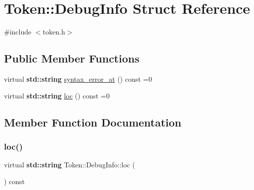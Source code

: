 \hypertarget{struct_token_1_1_debug_info}{}\section{Token\+:\+:Debug\+Info Struct Reference}
\label{struct_token_1_1_debug_info}


{\ttfamily \#include $<$token.\+h$>$}

\subsection*{Public Member Functions}
\begin{DoxyCompactItemize}
\item 
virtual \textbf{ std\+::string} \hyperlink{struct_token_1_1_debug_info_a4d66aa65422c236198bbcc616bba250f}{syntax\+\_\+error\+\_\+at} () const =0
\item 
virtual \textbf{ std\+::string} \hyperlink{struct_token_1_1_debug_info_a0860d9b875240dafa0e00756d27e55bb}{loc} () const =0
\end{DoxyCompactItemize}


\subsection{Member Function Documentation}
\mbox{\label{struct_token_1_1_debug_info_a0860d9b875240dafa0e00756d27e55bb}} 
\subsubsection{\texorpdfstring{loc()}{loc()}}
{\footnotesize\ttfamily virtual \textbf{ std\+::string} Token\+::\+Debug\+Info\+::loc (\begin{DoxyParamCaption}{ }\end{DoxyParamCaption}) const\hspace{0.3cm}{\ttfamily [pure virtual]}}

\mbox{\label{struct_token_1_1_debug_info_a4d66aa65422c236198bbcc616bba250f}} 
